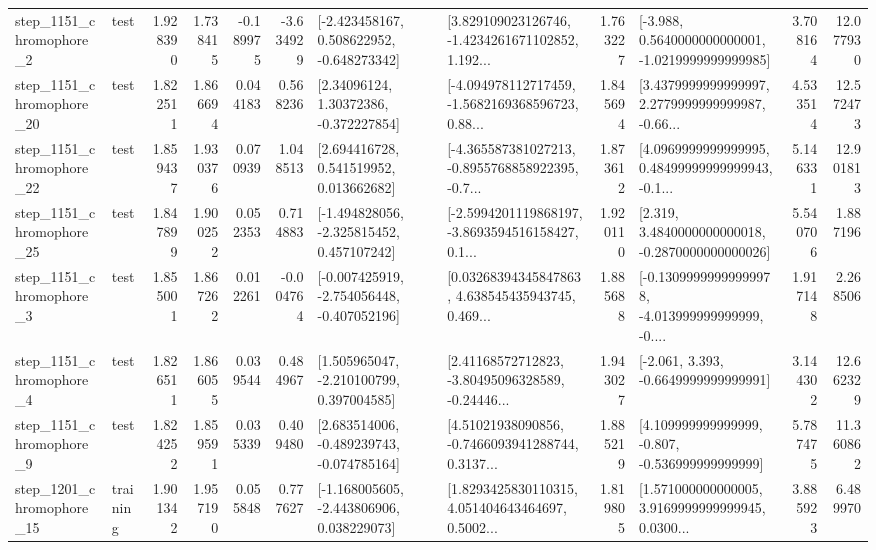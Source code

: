 \begin{tabular}{llrrrrllrlrr}
  step\_1151\_chromophore\_2 &      test &      1.928390 &    1.738415 &     -0.189975 & -3.634929 &   [-2.423458167, 0.508622952, -0.648273342] &  [3.829109023126746, -1.4234261671102852, 1.192... &       1.763227 &  [-3.988, 0.5640000000000001, -1.0219999999999985] &            3.708164 &         12.077930 \\
 step\_1151\_chromophore\_20 &      test &      1.822511 &    1.866694 &      0.044183 &  0.568236 &      [2.34096124, 1.30372386, -0.372227854] &  [-4.094978112717459, -1.5682169368596723, 0.88... &       1.845694 &  [3.4379999999999997, 2.2779999999999987, -0.66... &            4.533514 &         12.572473 \\
 step\_1151\_chromophore\_22 &      test &      1.859437 &    1.930376 &      0.070939 &  1.048513 &     [2.694416728, 0.541519952, 0.013662682] &  [-4.365587381027213, -0.8955768858922395, -0.7... &       1.873612 &  [4.0969999999999995, 0.48499999999999943, -0.1... &            5.146331 &         12.901813 \\
 step\_1151\_chromophore\_25 &      test &      1.847899 &    1.900252 &      0.052353 &  0.714883 &   [-1.494828056, -2.325815452, 0.457107242] &  [-2.5994201119868197, -3.8693594516158427, 0.1... &       1.920110 &   [2.319, 3.4840000000000018, -0.2870000000000026] &            5.540706 &          1.887196 \\
  step\_1151\_chromophore\_3 &      test &      1.855001 &    1.867262 &      0.012261 & -0.004764 &  [-0.007425919, -2.754056448, -0.407052196] &  [0.03268394345847863, 4.638545435943745, 0.469... &       1.885688 &  [-0.13099999999999978, -4.013999999999999, -0.... &            1.917148 &          2.268506 \\
  step\_1151\_chromophore\_4 &      test &      1.826511 &    1.866055 &      0.039544 &  0.484967 &    [1.505965047, -2.210100799, 0.397004585] &  [2.41168572712823, -3.80495096328589, -0.24446... &       1.943027 &               [-2.061, 3.393, -0.6649999999999991] &            3.144302 &         12.662329 \\
  step\_1151\_chromophore\_9 &      test &      1.824252 &    1.859591 &      0.035339 &  0.409480 &   [2.683514006, -0.489239743, -0.074785164] &  [4.51021938090856, -0.7466093941288744, 0.3137... &       1.885219 &    [4.109999999999999, -0.807, -0.536999999999999] &            5.787475 &         11.360862 \\
 step\_1201\_chromophore\_15 &  training &      1.901342 &    1.957190 &      0.055848 &  0.777627 &   [-1.168005605, -2.443806906, 0.038229073] &  [1.8293425830110315, 4.051404643464697, 0.5002... &       1.819805 &  [1.571000000000005, 3.9169999999999945, 0.0300... &            3.885923 &          6.489970 \\

\end{tabular}
